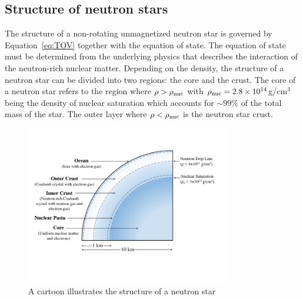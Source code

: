  \subsection{Structure of neutron stars}
 \label{sec:intro-structure}
 
The structure of a non-rotating unmagnetized neutron star is governed by Equation~\ref{eq:TOV} together with the equation of state.
The equation of state must be determined from the underlying physics that describes the interaction of the neutron-rich nuclear matter.
Depending on the density, the structure of a neutron star can be divided into two regions: the core and the crust. 
The core of a neutron star refers to the region where $\rho>\rho_{\rm nuc}$ with $\rho_{\rm nuc}=2.8\times 10^{14}$g/cm$^3$ being the density of nuclear saturation which accounts for $\sim 99\%$ of the total mass of the star.
The outer layer where $\rho<\rho_{\rm nuc}$ is the neutron star crust.
%
\begin{figure}[h]
  \centering
  \includegraphics[width=0.8\textwidth]{pics/intro/NS_structure.png}
  \caption[A cartoon illustrates the structure of a neutron star] {A cartoon illustrates the structure of a neutron star \citep{2017RvMP...89d1002C}}
  \label{fig:NS-structure}
\end{figure}
%
